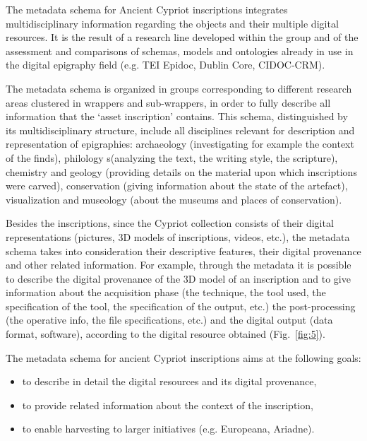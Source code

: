 \documentclass[amsthm,ebook]{saparticle}
\begin{document}
The metadata schema for Ancient Cypriot inscriptions integrates multidisciplinary information regarding the objects and
their multiple digital resources. It is the result of a research line developed within the group \citep{liuzzo_networking_2014} and of the assessment and comparisons of schemas, models and ontologies already in use in the digital epigraphy
field (e.g. TEI Epidoc, Dublin Core, CIDOC-CRM). 

The metadata schema is organized in groups corresponding to different research areas clustered in wrappers and
sub-wrappers, in order to fully describe all information that the ‘asset inscription’ contains. This schema,
distinguished by its multidisciplinary structure, include all disciplines relevant for description and representation
of epigraphies: archaeology (investigating for example the context of the finds), philology s(analyzing the text, the
writing style, the scripture), chemistry and geology (providing details on the material upon which inscriptions were
carved), conservation (giving information about the state of the artefact), visualization and museology (about the
museums and places of conservation).

Besides the inscriptions, since the Cypriot collection consists of their digital representations (pictures, 3D models of
inscriptions, videos, etc.), the metadata schema takes into consideration their descriptive features, their digital
provenance and other related information. For example, through the metadata it is possible to describe the digital
provenance of the 3D model of an inscription and to give information about the acquisition phase (the technique, the
tool used, the specification of the tool, the specification of the output, etc.) the post-processing (the operative
info, the file specifications, etc.) and the digital output (data format, software), according to the digital resource
obtained (Fig.~\ref{fig:5}).

The metadata schema for ancient Cypriot inscriptions aims at the following goals:

\begin{itemize}
\item to describe in detail the digital resources and its digital provenance, 
\item to provide related information about the context of the inscription, 
\item to enable harvesting to larger initiatives (e.g. Europeana, Ariadne).
\end{itemize}
\end{document}
